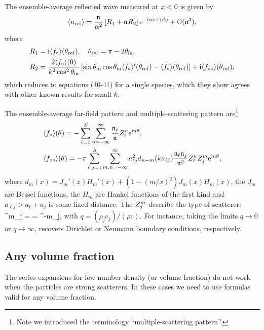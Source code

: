 \documentclass[12pt, a4paper]{article}
\begin{document}
The ensemble-average reflected wave measured at $x <0$ is given by
\begin{equation}
   \langle u_\mathrm{ref}\rangle =
     \frac{\mathfrak n_{}}{\alpha^2}\left [
 R_1 + \mathfrak n_{} R_2
  \right]\textrm{e}^{-\textrm{i} \alpha x + \textrm{i} \beta y} + \mathcal O (\mathfrak n_{}^3),
  \label{eqn:reflection_results}
\end{equation}
where
\begin{align}
  &R_1 = \textrm{i} \langle f_\circ \rangle(\theta_{\mathrm{ref}}), \quad \theta_{\mathrm{ref}} = \pi - 2 \theta_{\mathrm{in}},
  \\
  &R_2 = \frac{2 \langle f_\circ \rangle(0)}{k^2 \cos^2 \theta_{\mathrm{in}}}\left [\sin \theta_{\mathrm{in}} \cos \theta_{\mathrm{in}} \langle f_\circ \rangle'(\theta_{\mathrm{ref}})  - \langle f_\circ \rangle(\theta_{\mathrm{ref}}) \right] + \textrm{i} \langle f_{\circ\circ} \rangle(\theta_{\mathrm{ref}}),
\end{align}
which reduces to \cite{martin_multiple_2011} equations (40-41) for a single species, which they show agrees with other known results for small $k$.

The ensemble-average far-field pattern and multiple-scattering pattern are\footnote{Note we introduced the terminology ``multiple-scattering pattern''.}
\begin{align}
  &\langle f_\circ \rangle(\theta) = - \sum_{\ell=1}^S  \sum_{n=-\infty}^\infty  \frac{\mathfrak n_{\ell}}{\mathfrak n_{}} Z_\ell^n \textrm{e}^{\textrm{i} n \theta},
\notag \\
  &\langle f_{\circ\circ} \rangle(\theta) = - \pi  \sum_{\ell,j=1}^S \sum_{m,n=-\infty}^\infty  a_{\ell j}^2 d_{n-m}(k a_{\ell j})  \frac{\mathfrak n_{\ell} \mathfrak n_{j}}{\mathfrak n_{}^2}Z_\ell^n Z_j^m \textrm{e}^{\textrm{i} n \theta},
  \label{eqn:fcircs}
\end{align}
where $d_m(x) = J_m'(x) H_m'(x) + (1 - (m/x)^2)J_m(x) H_m(x)$, the $J_m$ are Bessel functions, the $H_m$ are Hankel functions of the first kind and $a_{\ell j} > a_\ell + a_j$ is some fixed distance. The  $Z^m_j$ describe the type of scatterer:
\be
\scatZ^m_j =  = \scatZ^{-m}_j,
\label{eqn:Zm}
\en
with $q = (\rho_j c_j)/(\rho c)$. For instance, taking the limits $q \to 0$ or $q \to \infty$, recovers Dirichlet or Neumann boundary conditions, respectively.

\subsection{Any volume fraction}

The series expansions for low number density (or volume fraction) do not work when the particles are strong scatterers. In these cases we need to use formulas valid for any volume fraction.
\end{document}
